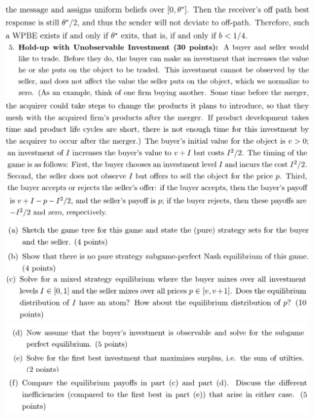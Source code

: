 \documentclass[8pt,landscape]{extarticle}
\begin{document}
\begin{multicols*}{3}
    \includegraphics[width=0.77\linewidth,keepaspectratio]{Screenshots/Screenshot 2024-03-11 195719.png}
    \includegraphics[width=0.77\linewidth,keepaspectratio]{Screenshots/Screenshot 2024-03-11 195730.png}
    \includegraphics[width=0.74\linewidth,keepaspectratio]{Screenshots/Screenshot 2024-03-11 195733.png}
    \includegraphics[width=0.75\linewidth,keepaspectratio]{Screenshots/Screenshot 2024-03-11 195737.png}
    \includegraphics[width=0.76\linewidth,keepaspectratio]{Screenshots/Screenshot 2024-03-11 195740.png}
    \includegraphics[width=0.74\linewidth,keepaspectratio]{Screenshots/Screenshot 2024-03-11 195748.png}
    \includegraphics[width=0.74\linewidth,keepaspectratio]{Screenshots/Screenshot 2024-03-11 195751.png}
    \includegraphics[width=0.76\linewidth,keepaspectratio]{Screenshots/Screenshot 2024-03-11 195755.png}
    \includegraphics[width=0.74\linewidth,keepaspectratio]{Screenshots/Screenshot 2024-03-11 195804.png}

\end{multicols*}
\end{document}
